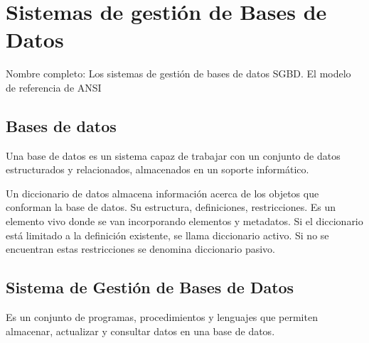 \setcounter{section}{62} %
\section{Sistemas de gestión de Bases de Datos}

Nombre completo: Los sistemas de gestión de bases de datos SGBD. El modelo de referencia de ANSI

\localtableofcontents

\subsection{Bases de datos}
Una base de datos es un sistema capaz de trabajar con un conjunto de datos estructurados y relacionados, almacenados en un soporte informático.

Un diccionario de datos almacena información acerca de los objetos que conforman la base de datos. Su estructura, definiciones, restricciones. Es un elemento vivo donde se van incorporando elementos y metadatos. Si el diccionario está limitado a la definición existente, se llama diccionario activo. Si no se encuentran estas restricciones se denomina diccionario pasivo.


\subsection{Sistema de Gestión de Bases de Datos}
    Es un conjunto de programas, procedimientos y lenguajes que permiten almacenar, actualizar y consultar datos en una base de datos.

